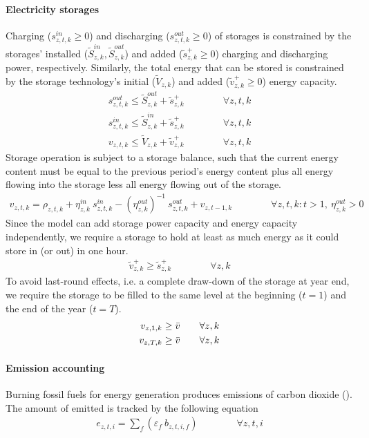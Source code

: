 \documentclass[review, 3p, times, 12pt, authoryear]{elsarticle}
\begin{document}
    \paragraph{Electricity storages}
    Charging ($s^{in}_{z,t,k} \geq 0$) and discharging ($s^{out}_{z,t,k} \geq 0$) of storages is constrained by the
    storages' installed ($\widetilde{S}^{in}_{z,k}, \widetilde{S}^{out}_{z,k}$) and added
    ($\widetilde{s}^{+}_{z,k} \geq 0$) charging and discharging power, respectively.
    Similarly, the total energy that can be stored is constrained by the storage technology's initial
    ($\widetilde{V}_{z,k}$) and added ($\widetilde{v}^{+}_{z,k} \geq 0$) energy capacity.
    \begin{align}
        s^{out}_{z,t,k} \leq \widetilde{S}^{out}_{z,k} + \widetilde{s}^{+}_{z,k}\qquad \qquad \forall z,t,k\\
        s^{in}_{z,t,k}\leq \widetilde{S}^{in}_{z,k} + \widetilde{s}^{+}_{z,k}\qquad \qquad \forall z,t,k\\
        v_{z,t,k}\leq \widetilde{V}_{z,k} +\widetilde{v}^{+}_{z,k}\qquad \qquad \forall z,t,k
    \end{align}
    Storage operation is subject to a storage balance, such that the current energy content must be equal to the
    previous period's energy content plus all energy flowing into the storage less all energy flowing out of the storage.
    \begin{align}
        v_{z,t,k} = \rho_{z,t,k} + \eta^{in}_{z,k}\:s^{in}_{z,t,k} - (\eta^{out}_{z,k})^{-1}\:s^{out}_{z,t,k} + v_{z,t-1,k}\qquad \qquad \forall z,t,k: t>1,\: \eta^{out}_{z,k} > 0
    \end{align}
    Since the model can add storage power capacity and energy capacity independently, we require a storage to hold at least as much energy as it could store in (or out) in one hour.
    \begin{align}
        \widetilde{v}^{+}_{z,k}\geq \widetilde{s}^{+}_{z,k}\qquad \qquad \forall z,k
    \end{align}
    To avoid last-round effects, i.e. a complete draw-down of the storage at year end, we require the storage to be filled to the same level at the beginning ($t=1$) and the end of the year ($t=T$).
    \begin{align}
        v_{z,1,k} \geq \Bar{v} \qquad \forall z, k\\
        v_{z,T,k} \geq \Bar{v} \qquad \forall z, k
    \end{align}

    \paragraph{Emission accounting}
    Burning fossil fuels for energy generation produces emissions of carbon dioxide (). The amount of  emitted
    is tracked by the following equation
    \begin{align}
        e_{z,t,i} = \sum_{f}\left(\varepsilon_{f}\:b_{z,t,i,f}\right)\qquad \qquad \forall z,t,i
    \end{align}
\end{document}
